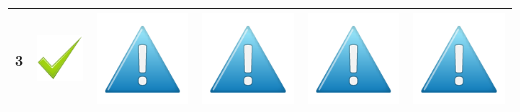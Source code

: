 \documentclass[12pt]{article}
\begin{document}
\begin{center}
\begin{tabular}{*{6}{|c}|}
    3 &\includegraphics[scale=0.2]{Billeder/godt} &  \includegraphics[scale=0.1]{Billeder/mindre}&  \includegraphics[scale=0.1]{Billeder/mindre}& \includegraphics[scale=0.1]{Billeder/mindre}&  \includegraphics[scale=0.1]{Billeder/mindre}\\
    \hline

\end{tabular}
\end{center}
\end{document}
